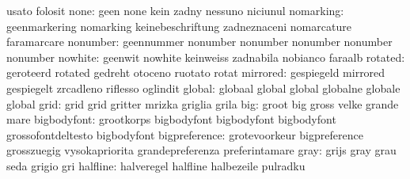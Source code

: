                            usato                     folosit
                     none: geen                      none
                           kein                      zadny
                           nessuno                   niciunul
                nomarking: geenmarkering             nomarking
                           keinebeschriftung         zadneznaceni
                           nomarcature               faramarcare
                 nonumber: geennummer                nonumber
                           nonumber                  nonumber
                           nonumber                  nonumber %
                  nowhite: geenwit                   nowhite
                           keinweiss                 zadnabila
                           nobianco                  faraalb
                  rotated: geroteerd                 rotated
                           gedreht                   otoceno
                           ruotato                   rotat
                 mirrored: gespiegeld                mirrored
                           gespiegelt                zrcadleno
                           riflesso                  oglindit
                   global: globaal                   global
                           global                    globalne
                           globale                   global
                     grid: grid                      grid
                           gritter                   mrizka
                           griglia                   grila
                      big: groot                     big
                           gross                     velke
                           grande                    mare
              bigbodyfont: grootkorps                bigbodyfont
                           bigbodyfont               bigbodyfont
                           grossofontdeltesto        bigbodyfont %
            bigpreference: grotevoorkeur             bigpreference
                           grosszuegig               vysokapriorita
                           grandepreferenza          preferintamare
                     gray: grijs                     gray
                           grau                      seda
                           grigio                    gri
                 halfline: halveregel                halfline
                           halbezeile                pulradku
